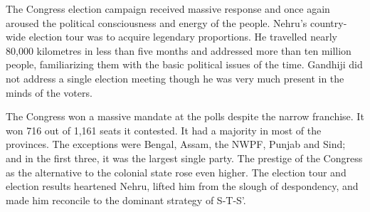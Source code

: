 The Congress election campaign received massive response and once again aroused the political consciousness and energy of the people. Nehru's country-wide election tour was to acquire legendary proportions. He travelled nearly 80,000 kilometres in less than five months and addressed more than ten million people, familiarizing them with the basic political issues of the time. Gandhiji did not address a single election meeting though he was very much present in the minds of the voters. 

The Congress won a massive mandate at the polls despite the narrow franchise. It won 716 out of 1,161 seats it contested. It had a majority in most of the provinces. The exceptions were Bengal, Assam, the NWPF, Punjab and Sind; and in the first three, it was the largest single party. The prestige of the Congress as the alternative to the colonial state rose even higher. The election tour and election results heartened Nehru, lifted him from the slough of despondency, and made him reconcile to the dominant strategy of S-T-S'.
